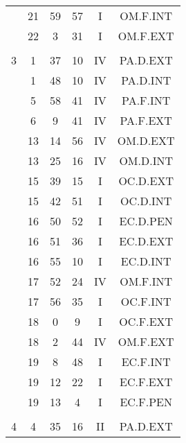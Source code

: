 \documentclass[12pt, a4paper]{article}
\begin{document}
\begin{multicols}{3}
{\begin{tabular}{c c c c c c}
	 	 	 	 & 21 & 59 & 57 & I & OM.F.INT\\%
	 	 	 	 & 22 & 3 & 31 & I & OM.F.EXT\\%
	 	 	 	 & & & & & \\%
	 	 	 	3 & 1 & 37 & 10 & IV & PA.D.EXT\\%
	 	 	 	 & 1 & 48 & 10 & IV & PA.D.INT\\%
	 	 	 	 & 5 & 58 & 41 & IV & PA.F.INT\\%
	 	 	 	 & 6 & 9 & 41 & IV & PA.F.EXT\\%
	 	 	 	 & 13 & 14 & 56 & IV & OM.D.EXT\\%
	 	 	 	 & 13 & 25 & 16 & IV & OM.D.INT\\%
	 	 	 	 & 15 & 39 & 15 & I & OC.D.EXT\\%
	 	 	 	 & 15 & 42 & 51 & I & OC.D.INT\\%
	 	 	 	 & 16 & 50 & 52 & I & EC.D.PEN\\%
	 	 	 	 & 16 & 51 & 36 & I & EC.D.EXT\\%
	 	 	 	 & 16 & 55 & 10 & I & EC.D.INT\\%
	 	 	 	 & 17 & 52 & 24 & IV & OM.F.INT\\%
	 	 	 	 & 17 & 56 & 35 & I & OC.F.INT\\%
	 	 	 	 & 18 & 0 & 9 & I & OC.F.EXT\\%
	 	 	 	 & 18 & 2 & 44 & IV & OM.F.EXT\\%
	 	 	 	 & 19 & 8 & 48 & I & EC.F.INT\\%
	 	 	 	 & 19 & 12 & 22 & I & EC.F.EXT\\%
	 	 	 	 & 19 & 13 & 4 & I & EC.F.PEN\\%
	 	 	 	 & & & & & \\%
	 	 	 	4 & 4 & 35 & 16 & II & PA.D.EXT\\%

\end{tabular}}
\end{multicols}
\end{document}
